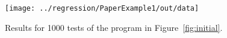 \documentclass{sigplanconf}
\newenvironment{code}{\begin{alltt}\footnotesize}{\end{alltt}}
\newcommand{\ttp}[1]{\texttt{#1}}
\begin{document}



%


%

\begin{figure}[ht]
\texttt{[image: ../regression/PaperExample1/out/data]}
  \caption{Results for 1000 tests of the program in Figure~\ref{fig:initial}.}
  \label{fig:graphs}
\end{figure}
\end{document}
